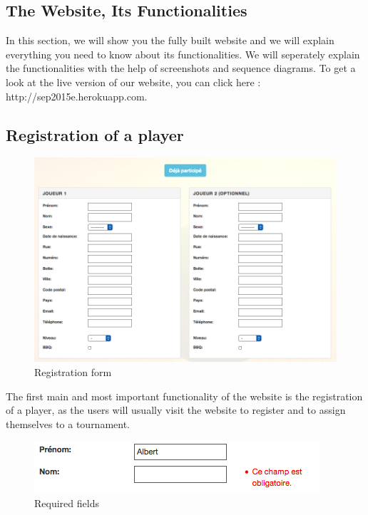 \documentclass[a4paper, 12pt]{article}
\begin{document}
\subsection{The Website, Its Functionalities}

In this section, we will show you the fully built website and we will explain everything you need to know about its functionalities. We will seperately explain the functionalities with the help of screenshots and sequence diagrams. To get a look at the live version of our website, you can click here : http://sep2015e.herokuapp.com. \\



\subsection*{Registration of a player}

\begin{figure}[h]
\caption{\label{register} Registration form}
\includegraphics[scale=0.5]{playerform.png}
\end{figure}
\FloatBarrier

The first main and most important functionality of the website is the registration of a player, as the users will usually visit the website to register and to assign themselves to a tournament.\\

\begin{figure}[h]
\caption{\label{obligatoire} Required fields}
\includegraphics[scale=0.7]{obligatoire.png}
\end{figure}
\FloatBarrier
\end{document}
